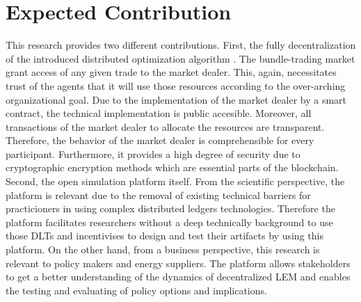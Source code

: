 \section{Expected Contribution}
\label{sec:expected_contribution}

This research provides two different contributions. 
First, the fully decentralization of the introduced distributed 
optimization algorithm . 
The bundle-trading market grant access of any given trade to the market dealer. 
This, again, necessitates trust of the agents that it will use those resources 
according to the over-arching organizational goal. Due to the implementation 
of the market dealer by a smart contract, the technical implementation 
is public accesible. Moreover, all transactions of the market dealer 
to allocate the resources are transparent. Therefore, the behavior of the 
market dealer is comprehensible for every participant. Furthermore, it provides 
a high degree of security due to cryptographic encryption methods which are essential 
parts of the blockchain.
Second, the open simulation platform itself. From the scientific perspective, 
the platform is relevant due to the removal of existing technical barriers 
for practicioners in using complex distributed ledgers technologies. 
Therefore the platform facilitates researchers without a deep 
technically background to use those DLTs and incentivises to design 
and test their artifacts by using this platform. 
On the other hand, from a business perspective, this research is 
relevant to policy makers and energy suppliers. The platform allows 
stakeholders to get a better understanding of the dynamics of decentralized 
LEM and enables the testing and evaluating of policy options and implications. 

\clearpage